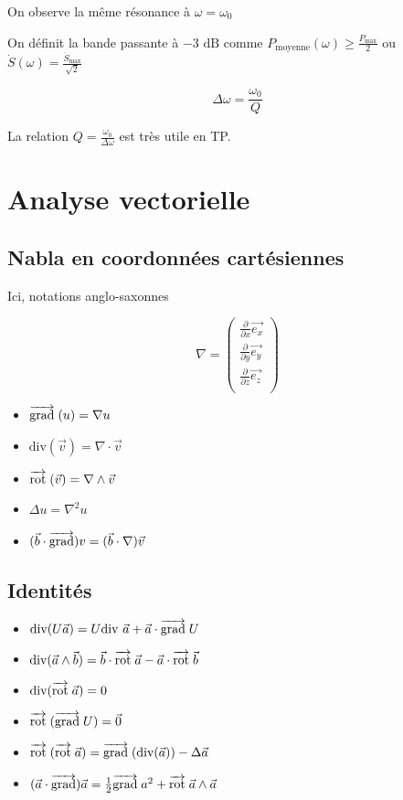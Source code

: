 \documentclass[openany]{book}
\begin{document}
\noindent On observe la même résonance à $ \omega = \omega_0 $

\noindent On définit la bande passante à $-3 \text{ dB}$ comme $ P_{\text{moyenne}}(\omega) \geq \frac{P_{\text{max}}}{2} $ ou $ \dot{S}(\omega) = \frac{\dot{S}_{\text{max}}}{\sqrt{2}}  $ 

\[ \Delta \omega = \frac{\omega_0}{Q} \]

\noindent La relation $Q = \frac{\omega_0}{\Delta \omega}$ est très utile en TP. 

\section{Analyse vectorielle}

\subsection{Nabla en coordonnées cartésiennes}
Ici, notations anglo-saxonnes

\[ \nabla = \begin{pmatrix}
    \frac{\partial}{\partial x} \vec{e_x} \\
    \frac{\partial}{\partial y} \vec{e_y} \\
    \frac{\partial}{\partial z} \vec{e_z} \\
\end{pmatrix} \]

\begin{itemize}
    \item $\overrightarrow{{\text{grad}}} \;(u) = \nabla u$
    \item $\text{div}(\vec{v}) = \nabla \cdot \vec{v}$
    \item $\overrightarrow{\text{rot}} \;(\vec{v}) = \nabla \wedge \vec{v}$
    \item $\Delta u = \nabla^2 u$
    \item $(\vec{b}\cdot\overrightarrow{{\text{grad}}})v = (\vec{b}\cdot\nabla)\vec{v}$
\end{itemize}

\subsection{Identités}

\begin{itemize}
    \item $\text{div}(U \vec{a}) = U \text{div } \vec{a} + \vec{a} \cdot \overrightarrow{{\text{grad}}} \; U$
    \item $\text{div}(\vec{a} \wedge \vec{b}) = \vec{b} \cdot \overrightarrow{\text{rot}} \; \vec{a} - \vec{a} \cdot \overrightarrow{\text{rot}} \; \vec{b}$
    \item $\text{div}(\overrightarrow{\text{rot}} \; \vec{a}) = 0$
    \item $\overrightarrow{\text{rot}} \;(\overrightarrow{{\text{grad}}} \; U) = \vec{0}$
    \item $\overrightarrow{\text{rot}} \;(\overrightarrow{\text{rot}} \; \vec{a}) = \overrightarrow{{\text{grad}}} \;(\text{div}(\vec{a})) - \Delta \vec{a}$
    \item $(\vec{a}\cdot\overrightarrow{{\text{grad}}})\vec{a} = \frac{1}{2}\overrightarrow{{\text{grad}}} \; a^2 + \overrightarrow{\text{rot}} \; \vec{a} \wedge \vec{a}$
\end{itemize}
\end{document}
